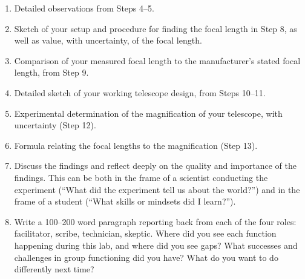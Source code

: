\begin{enumerate}
	
	\item Detailed observations from Steps 4--5.
	
	\item Sketch of your setup and procedure for finding the focal length in Step 8, as well as value, with uncertainty, of the focal length.
	
	\item Comparison of your measured focal length to the manufacturer's stated focal length, from Step 9.
	
	\item Detailed sketch of your working telescope design, from Steps 10--11.
	
	\item Experimental determination of the magnification of your telescope, with uncertainty (Step 12).
	
	\item Formula relating the focal lengths to the magnification (Step 13).
	
	\item Discuss the findings and reflect deeply on the quality and importance of the findings. This can be both in the frame of a scientist conducting the experiment (``What did the experiment tell us about the world?'') and in the frame of a student (``What skills or mindsets did I learn?'').
	
	\item Write a 100--200 word paragraph reporting back from each of the four roles: facilitator, scribe, technician, skeptic. Where did you see each function happening during this lab, and where did you see gaps? What successes and challenges in group functioning did you have? What do you want to do differently next time?
\end{enumerate}


%	
%	
%	
%	
%	
%	
%	
